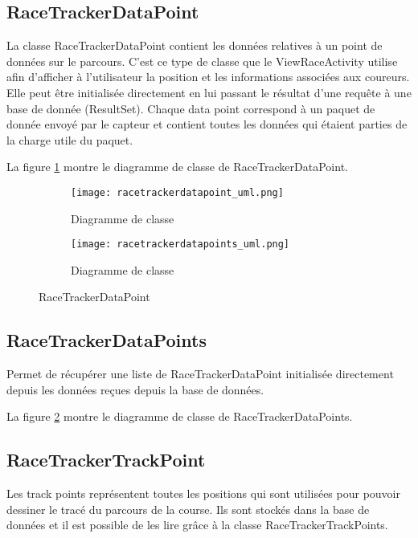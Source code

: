 \subsection{RaceTrackerDataPoint}

La classe RaceTrackerDataPoint contient les données relatives à un point de données sur le parcours. C'est ce type de classe que le ViewRaceActivity utilise afin d'afficher à l'utilisateur la position et les informations associées aux coureurs. Elle peut être initialisée directement en lui passant le résultat d'une requête à une base de donnée (ResultSet). Chaque data point correspond à un paquet de donnée envoyé par le capteur et contient toutes les données qui étaient parties de la charge utile du paquet.

La figure \ref{fig:racetrackerdatapoint_uml} montre le diagramme de classe de RaceTrackerDataPoint.
 
 \begin{figure}[htb!]
    \centering
    \begin{subfigure}[htb]{1\textwidth}
		\texttt{[image: racetrackerdatapoint\_uml.png]} 
		\caption{Diagramme de classe}
		\label{fig:racetrackerdatapoint_uml}
    \end{subfigure}
    \begin{subfigure}[htb]{1\textwidth}
		\texttt{[image: racetrackerdatapoints\_uml.png]} 
		\caption{Diagramme de classe}
		\label{fig:racetrackerdatapoints_uml}
    \end{subfigure}
    \caption{RaceTrackerDataPoint}\label{fig:racetrackerdatapoints_fig}
\end{figure}

\subsection{RaceTrackerDataPoints}

Permet de récupérer une liste de RaceTrackerDataPoint initialisée directement depuis les données reçues depuis la base de données.

La figure \ref{fig:racetrackerdatapoints_uml} montre le diagramme de classe de RaceTrackerDataPoints.

\subsection{RaceTrackerTrackPoint}

Les track points représentent toutes les positions qui sont utilisées pour pouvoir dessiner le tracé du parcours de la course. Ils sont stockés dans la base de données et il est possible de les lire grâce à la classe RaceTrackerTrackPoints.

